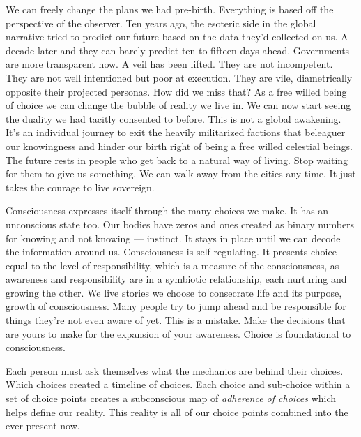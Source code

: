 \documentclass[letterpaper,11pt,twoside,titlepage,onecolumn,openany]{book}
\begin{document}
We can freely change the plans we had pre-birth. Everything is based off
the perspective of the observer. Ten years ago, the esoteric side in the
global narrative tried to predict our future based on the data they'd
collected on us. A decade later and they can barely predict ten to
fifteen days ahead. Governments are more transparent now. A veil has
been lifted. They are not incompetent. They are not well intentioned but
poor at execution. They are vile, diametrically opposite their projected
personas. How did we miss that? As a free willed being of choice we can
change the bubble of reality we live in. We can now start seeing the
duality we had tacitly consented to before. This is not a global
awakening. It's an individual journey to exit the heavily militarized
factions that beleaguer our knowingness and hinder our birth right of
being a free willed celestial beings. The future rests in people who get
back to a natural way of living. Stop waiting for them to give us
something. We can walk away from the cities any time. It just takes the
courage to live sovereign.

Consciousness expresses itself through the many choices we make. It has
an unconscious state too. Our bodies have zeros and ones created as
binary numbers for knowing and not knowing --- instinct. It stays in
place until we can decode the information around us. Consciousness is
self-regulating. It presents choice equal to the level of
responsibility, which is a measure of the consciousness, as awareness
and responsibility are in a symbiotic relationship, each nurturing and
growing the other. We live stories we choose to consecrate life and its
purpose, growth of consciousness. Many people try to jump ahead and be
responsible for things they're not even aware of yet. This is a mistake.
Make the decisions that are yours to make for the expansion of your
awareness. Choice is foundational to consciousness.

Each person must ask themselves what the mechanics are behind their
choices. Which choices created a timeline of choices. Each choice and
sub-choice within a set of choice points creates a subconscious map of
\emph{adherence of choices} which helps define our reality. This reality
is all of our choice points combined into the ever present now.
\end{document}
